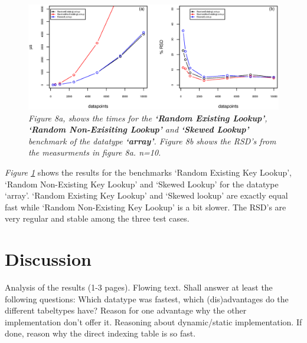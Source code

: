 \documentclass[a4paper,11pt,twoside]{article}
\begin{document}
\begin{figure}[H] 
\centering 
\includegraphics[width=\textwidth]{figures/fig8.eps}
\caption{\textit{Figure 8a, shows the times for the \textbf{`Random Existing
    Lookup'}, \textbf{`Random Non-Exisiting Lookup'} and
  \textbf{`Skewed Lookup'} benchmark of the datatype \textbf{`array'}. Figure 8b shows the RSD's from the measurments
in figure 8a. n=10.}}
\label{fig:array}
\end{figure}

\textit{Figure \ref{fig:array}} shows the results for the benchmarks
`Random Existing Key Lookup', `Random Non-Existing Key Lookup' and
`Skewed Lookup' for the datatype `array'. `Random Existing Key Lookup' and
`Skewed lookup' are exactly equal fast while `Random Non-Existing Key
Lookup' is a bit slower. The RSD's are very regular and stable among
the three test cases.


\section{Discussion}

Analysis of the results (1-3 pages). Flowing text. Shall answer at
least the following questions:
Which datatype was fastest, which (dis)advantages do the different
tabeltypes have? Reason for one advantage why the other implementation
don't offer it. Reasoning about dynamic/static implementation. If
done, reason why the direct indexing table is so fast.


\end{document}
